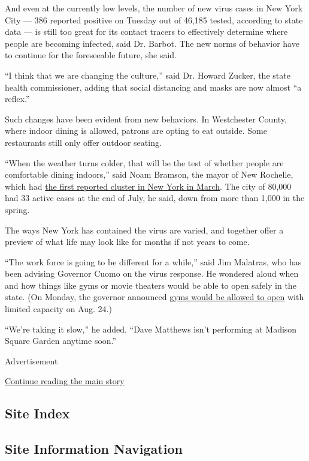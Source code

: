 And even at the currently low levels, the number of new virus cases in
New York City --- 386 reported positive on Tuesday out of 46,185 tested,
according to state data --- is still too great for its contact tracers
to effectively determine where people are becoming infected, said Dr.
Barbot. The new norms of behavior have to continue for the foreseeable
future, she said.

``I think that we are changing the culture,'' said Dr. Howard Zucker,
the state health commissioner, adding that social distancing and masks
are now almost ``a reflex.''

Such changes have been evident from new behaviors. In Westchester
County, where indoor dining is allowed, patrons are opting to eat
outside. Some restaurants still only offer outdoor seating.

``When the weather turns colder, that will be the test of whether people
are comfortable dining indoors,'' said Noam Bramson, the mayor of New
Rochelle, which had
\href{https://www.nytimes3xbfgragh.onion/2020/03/10/nyregion/coronavirus-new-york-update.html}{the
first reported cluster in New York in March}. The city of 80,000 had 33
active cases at the end of July, he said, down from more than 1,000 in
the spring.

The ways New York has contained the virus are varied, and together offer
a preview of what life may look like for months if not years to come.

``The work force is going to be different for a while,'' said Jim
Malatras, who has been advising Governor Cuomo on the virus response. He
wondered aloud when and how things like gyms or movie theaters would be
able to open safely in the state. (On Monday, the governor announced
\href{https://www.nytimes3xbfgragh.onion/2020/08/17/nyregion/nyc-gyms-reopening.html}{gyms
would be allowed to open} with limited capacity on Aug. 24.)

``We're taking it slow,'' he added. ``Dave Matthews isn't performing at
Madison Square Garden anytime soon.''

Advertisement

\protect\hyperlink{after-bottom}{Continue reading the main story}

\hypertarget{site-index}{%
\subsection{Site Index}\label{site-index}}

\hypertarget{site-information-navigation}{%
\subsection{Site Information
Navigation}\label{site-information-navigation}}


